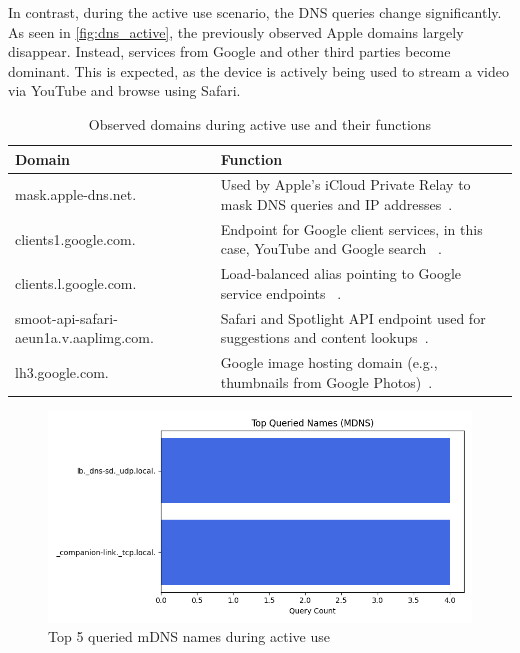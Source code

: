 \documentclass[sigconf,nonacm]{acmart}
\begin{document}
In contrast, during the active use scenario, the DNS queries change significantly. As seen in \cref{fig:dns_active}, the previously observed Apple domains largely disappear. Instead, services from Google and other third parties become dominant. This is expected, as the device is actively being used to stream a video via YouTube and browse using Safari.

\begin{table}[ht]
\centering
\caption{Observed domains during active use and their functions}
\label{tab:idle_dns_domains}
\begin{tabular}{@{}ll@{}}
\toprule
\textbf{Domain} & \textbf{Function} \\
\midrule
mask.apple-dns.net. & Used by Apple's iCloud Private Relay to mask DNS queries and IP addresses~\cite{apple_mask_dns}. \\
clients1.google.com. & Endpoint for Google client services, in this case, YouTube and Google search ~\cite{clients1_google_gitlab}. \\
clients.l.google.com. & Load-balanced alias pointing to Google service endpoints ~\cite{clients_l_google_gitlab}. \\
smoot-api-safari-aeun1a.v.aaplimg.com. & Safari and Spotlight API endpoint used for suggestions and content lookups~\cite{smoot_api_safari_hn}. \\
lh3.google.com. & Google image hosting domain (e.g., thumbnails from Google Photos)~\cite{lh3_google_photos}. \\
\bottomrule
\end{tabular}
\end{table}

\begin{figure}[htbp]
    \centering
    \includegraphics[width=\columnwidth]{images/part2/active use/top_queried_names_mdns.png}
    \caption{Top 5 queried mDNS names during active use}
    \label{fig:mdns_active}
\end{figure}
\end{document}
